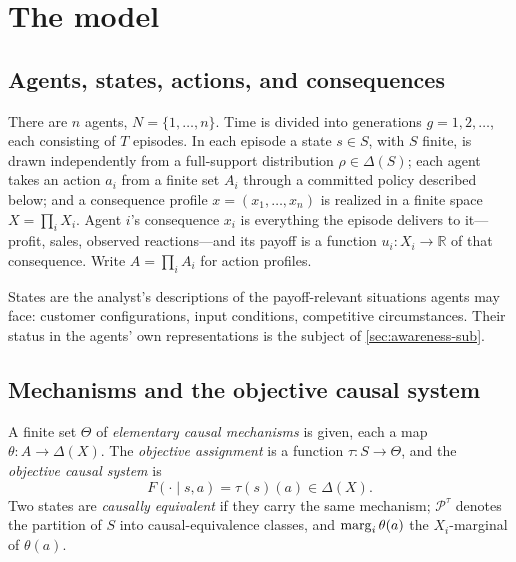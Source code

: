 \section{The model}
\label{sec:model}

\subsection{Agents, states, actions, and consequences}
\label{sec:primitives}

There are $n$ agents, $N=\{1,\dots,n\}$.  Time is divided into generations
$g=1,2,\dots$, each consisting of $T$ episodes.  In each episode a state
$s\in S$, with $S$ finite, is drawn independently from a full-support
distribution $\rho\in\Delta(S)$; each agent takes an action $a_i$ from a
finite set $A_i$ through a committed policy described below; and a
consequence profile $x=(x_1,\dots,x_n)$ is realized in a finite space
$X=\prod_iX_i$.  Agent $i$'s consequence $x_i$ is everything the episode
delivers to it---profit, sales, observed reactions---and its payoff is a
function $u_i:X_i\to\mathbb R$ of that consequence.  Write $A=\prod_iA_i$ for
action profiles.

States are the analyst's descriptions of the payoff-relevant situations
agents may face: customer configurations, input conditions, competitive
circumstances.  Their status in the agents' own representations is the
subject of \cref{sec:awareness-sub}.

\subsection{Mechanisms and the objective causal system}
\label{sec:mechanisms-sub}

\begin{definition}
\label{def:mechanisms}
A finite set $\Theta$ of \emph{elementary causal mechanisms} is given, each a
map $\theta:A\to\Delta(X)$.  The \emph{objective assignment} is a function
$\tau:S\to\Theta$, and the \emph{objective causal system} is
\begin{equation}
F(\cdot\mid s,a)=\tau(s)(a)\in\Delta(X).
\label{eq:objective-system}
\end{equation}
Two states are \emph{causally equivalent} if they carry the same mechanism;
$\mathcal P^{\tau}$ denotes the partition of $S$ into causal-equivalence
classes, and $\operatorname{marg}_{i}\theta(a)$ the $X_i$-marginal of $\theta(a)$.
\end{definition}


